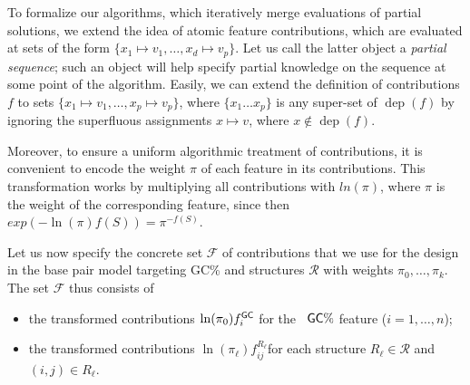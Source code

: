 \documentclass[]{bmcart}
\newtheorem{definition}[theorem]{Definition}
\newcommand{\network}{\mathcal{N}}
\newcommand{\dep}{\operatorname{dep}}
\newcommand{\real}{\mathbb{R}}
\newcommand{\F}{\mathcal{F}}
\newcommand{\R}{\mathcal{R}}
\newcommand{\X}{\mathcal{X}}
\newcommand{\Def}[1]{\emph{#1}}
\newcommand{\Nuc}[1]{{\sf #1}}
\newcommand{\Cb}{\Nuc{C}}
\newcommand{\Gb}{\Nuc{G}}
\newcommand{\GCb}{\Gb\Cb}
\begin{document}
To formalize our algorithms, which iteratively merge evaluations of partial solutions, we extend the idea of atomic feature contributions, which are evaluated at sets of the form $\{x_1\mapsto v_1, \dots, x_d\mapsto v_p\}$. Let us call the latter object a \Def{partial sequence}; such an object will help specify partial knowledge on the sequence at some point of the algorithm. Easily, we can extend the definition of contributions $f$ to sets $\{x_1\mapsto v_1, \dots, x_p\mapsto v_p\}$, where $\{x_1\dots x_p\}$ is any super-set of $\dep(f)$ by ignoring the superfluous assignments $x\mapsto v$, where $x\not\in\dep(f)$. 

%


Moreover, to ensure a uniform algorithmic treatment of contributions, it is convenient to encode the weight $\pi$ of each feature in its contributions. This transformation works by multiplying all contributions with $ln(\pi)$, where $\pi$ is the weight of the corresponding feature, since then
$exp(-\ln(\pi)f(S))=\pi^{-f(S)}.$

%
Let us now specify the concrete set $\F$ of contributions that we use
for the design in the base pair model targeting \GCb\% and structures $\R$ with weights $\pi_0,\dots,\pi_k$. The set $\F$ thus consists of
\begin{itemize}
\item the transformed contributions $\ln(\pi_0)f^{\GCb}_i$ for the ~$\GCb\%$ feature ($i=1,\dots,n$);
\item the transformed contributions $\ln(\pi_\ell)f^{R_\ell}_{ij}$for each structure $R_\ell\in\R$ and $(i,j)\in R_\ell.$
\end{itemize}
\end{document}
